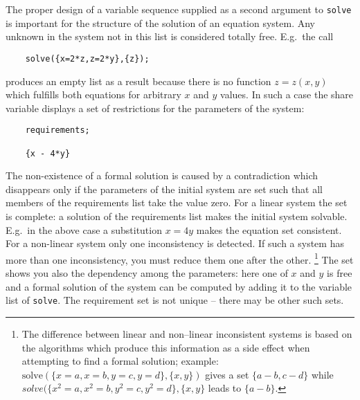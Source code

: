 The proper design of a variable sequence
supplied as a second argument to \texttt{solve} is important
for the structure of the solution of an equation system.
Any unknown in the system
not in this list is considered totally free. E.g.\  the call
\begin{verbatim}
    solve({x=2*z,z=2*y},{z});
\end{verbatim}
produces an empty list as a result because there is no function
$z=z(x,y)$ which fulfills both equations for arbitrary $x$ and $y$ values.
\hypertarget{reserved:requirements}{}
In such a case the share variable 
displays a set of restrictions for the parameters of the system:
\begin{verbatim}
    requirements;

    {x - 4*y}
\end{verbatim}
The non-existence of a formal solution is caused by a
contradiction which disappears only if the parameters
of the initial system are set such that all members
of the requirements list take the value zero.
For a linear system the set is complete: a solution
of the requirements list makes the initial
system solvable. E.g.\  in the above case a substitution
$x=4y$ makes the equation set consistent. For a non-linear
system only one inconsistency is detected. If such a system
has more than one inconsistency, you must reduce them
one after the other.
\footnote{
The difference between linear and non--linear
inconsistent systems is based on the algorithms which
produce this information as a side effect when attempting
to find a formal solution; example:
$\mathrm{solve}(\{x=a,x=b,y=c,y=d\},\{x,y\})$ gives a set $\{a-b,c-d\}$
while $solve(\{x^2=a,x^2=b,y^2=c,y^2=d\},\{x,y\}$ leads to $\{a-b\}$.
}
The  set shows you also the dependency among the parameters: here
one of $x$ and $y$ is free and a formal solution of the system can be
computed by adding it to the variable list of \texttt{solve}.
The requirement set is not unique -- there may be other such sets.


